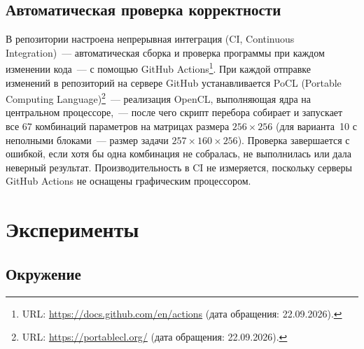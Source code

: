 \documentclass[a4paper]{article}
\begin{document}
\subsection{Автоматическая проверка корректности}

В репозитории настроена непрерывная интеграция (CI, Continuous
Integration)~--- автоматическая сборка и проверка программы при каждом
изменении кода~--- с помощью GitHub
Actions\footnote{URL: \url{https://docs.github.com/en/actions}
(дата обращения: 22.09.2026).}. При каждой отправке изменений в
репозиторий на сервере GitHub устанавливается PoCL (Portable Computing
Language)\footnote{URL: \url{https://portablecl.org/}
(дата обращения: 22.09.2026).}~--- реализация OpenCL, выполняющая ядра
на центральном процессоре,~--- после чего скрипт перебора собирает и
запускает все 67 комбинаций параметров на матрицах размера
$256 \times 256$ (для варианта~10 с неполными блоками~--- размер задачи
$257 \times 160 \times 256$). Проверка завершается с ошибкой, если хотя
бы одна комбинация не собралась, не выполнилась или дала неверный
результат. Производительность в CI не измеряется, поскольку серверы
GitHub Actions не оснащены графическим процессором.

\section{Эксперименты}

\subsection{Окружение}
\end{document}
